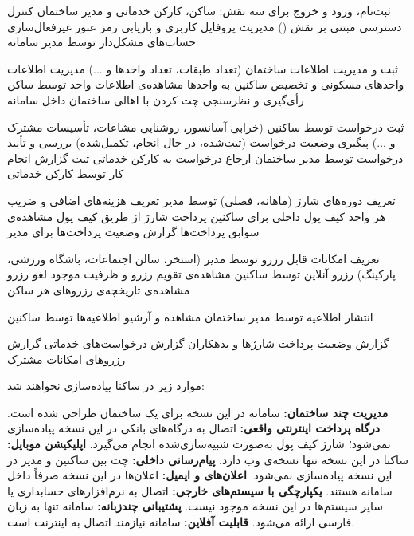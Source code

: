 


 ثبت‌نام، ورود و خروج برای سه نقش: ساکن، کارکن خدماتی و مدیر ساختمان
 کنترل دسترسی مبتنی بر نقش ()
 مدیریت پروفایل کاربری و بازیابی رمز عبور
 غیرفعال‌سازی حساب‌های مشکل‌دار توسط مدیر سامانه

 ثبت و مدیریت اطلاعات ساختمان (تعداد طبقات، تعداد واحدها و ...)
 مدیریت اطلاعات واحدهای مسکونی و تخصیص ساکنین به واحدها
 مشاهده‌ی اطلاعات واحد توسط ساکن
 رأی‌گیری و نظرسنجی
 چت کردن با اهالی ساختمان داخل سامانه

 ثبت درخواست توسط ساکنین (خرابی آسانسور، روشنایی مشاعات، تأسیسات مشترک و ...)
 پیگیری وضعیت درخواست (ثبت‌شده، در حال انجام، تکمیل‌شده)
 بررسی و تأیید درخواست توسط مدیر ساختمان
 ارجاع درخواست به کارکن خدماتی
 ثبت گزارش انجام کار توسط کارکن خدماتی

 تعریف دوره‌های شارژ (ماهانه، فصلی) توسط مدیر
 تعریف هزینه‌های اضافی و ضریب هر واحد
 کیف پول داخلی برای ساکنین
 پرداخت شارژ از طریق کیف پول
 مشاهده‌ی سوابق پرداخت‌ها
 گزارش وضعیت پرداخت‌ها برای مدیر

 تعریف امکانات قابل رزرو توسط مدیر (استخر، سالن اجتماعات، باشگاه ورزشی، پارکینگ)
 رزرو آنلاین توسط ساکنین
 مشاهده‌ی تقویم رزرو و ظرفیت موجود
 لغو رزرو
 مشاهده‌ی تاریخچه‌ی رزروهای هر ساکن

 انتشار اطلاعیه توسط مدیر ساختمان
 مشاهده و آرشیو اطلاعیه‌ها توسط ساکنین

 گزارش وضعیت پرداخت شارژها و بدهکاران
 گزارش درخواست‌های خدماتی
 گزارش رزروهای امکانات مشترک


موارد زیر در ساکنا پیاده‌سازی نخواهند شد:

 \textbf{مدیریت چند ساختمان:} سامانه در این نسخه برای یک ساختمان طراحی شده است.
 \textbf{درگاه پرداخت اینترنتی واقعی:} اتصال به درگاه‌های بانکی در این نسخه پیاده‌سازی نمی‌شود؛ شارژ کیف پول به‌صورت شبیه‌سازی‌شده انجام می‌گیرد.
 \textbf{اپلیکیشن موبایل:} ساکنا در این نسخه تنها نسخه‌ی وب دارد.
 \textbf{پیام‌رسانی داخلی:} چت بین ساکنین و مدیر در این نسخه پیاده‌سازی نمی‌شود.
 \textbf{اعلان‌های  و ایمیل:} اعلان‌ها در این نسخه صرفاً داخل سامانه هستند.
 \textbf{یکپارچگی با سیستم‌های خارجی:} اتصال به نرم‌افزارهای حسابداری یا سایر سیستم‌ها در این نسخه موجود نیست.
 \textbf{پشتیبانی چندزبانه:} سامانه تنها به زبان فارسی ارائه می‌شود.
 \textbf{قابلیت آفلاین:} سامانه نیازمند اتصال به اینترنت است.

